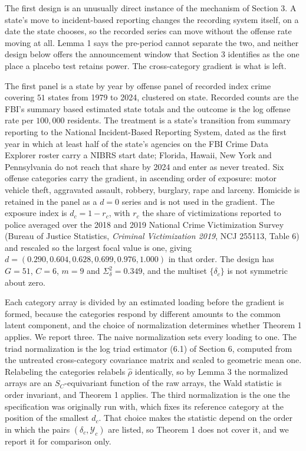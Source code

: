 \documentclass[12pt]{article}
\theoremstyle{definition}
\numberwithin{equation}{section}
\begin{document}
The first design is an unusually direct instance of the mechanism of Section
3. A state's move to incident-based reporting changes the recording
system itself, on a date the state chooses, so the recorded series can move
without the offense rate moving at all. Lemma 1 says the pre-period cannot separate the two, and neither design below offers the announcement window
that Section 3 identifies as the one place a placebo test retains
power. The cross-category gradient is what is left.

The first panel is a state by year by offense panel of recorded index crime
covering $51$ states from 1979 to 2024, clustered on state. Recorded counts are
the FBI's summary based estimated state totals and the outcome is the log
offense rate per $100{,}000$ residents. The treatment is a state's transition
from summary reporting to the National Incident-Based Reporting System, dated
as the first year in which at least half of the state's agencies on the FBI
Crime Data Explorer roster carry a NIBRS start date; Florida, Hawaii, New York
and Pennsylvania do not reach that share by 2024 and enter as never treated.
Six offense categories carry the gradient, in ascending order of exposure:
motor vehicle theft, aggravated assault, robbery, burglary, rape and larceny.
Homicide is retained in the panel as a $d = 0$ series and is not used in the
gradient. The exposure index is $d_c = 1 - r_c$, with $r_c$ the share of
victimizations reported to police averaged over the 2018 and 2019 National
Crime Victimization Survey (Bureau of Justice Statistics, \emph{Criminal
Victimization 2019}, NCJ 255113, Table 6) and rescaled so the largest focal
value is one, giving $d = (0.290, 0.604, 0.628, 0.699, 0.976, 1.000)$ in that
order. The design has $G = 51$, $C = 6$, $m = 9$ and $\Sigma_\delta^2 = 0.349$,
and the multiset $\{\delta_c\}$ is not symmetric about zero.

Each category array is divided by an estimated loading before the gradient is
formed, because the categories respond by different amounts to the common
latent component, and the choice of normalization determines whether Theorem
1 applies. We report three. The naive normalization sets every
loading to one. The triad normalization is the log triad estimator
(6.1) of Section 6, computed from the untreated
cross-category covariance matrix and scaled to geometric mean one. Relabeling
the categories relabels $\hat{\rho}$ identically, so by Lemma 3
the normalized arrays are an $S_C$-equivariant function of the raw arrays, the
Wald statistic is order invariant, and Theorem 1 applies. The third
normalization is the one the specification was originally run with, which fixes
its reference category at the position of the smallest $d_c$. That choice makes
the statistic depend on the order in which the pairs $(\delta_c,\mathcal{Y}_c)$
are listed, so Theorem 1 does not cover it, and we report it for
comparison only.
\end{document}
